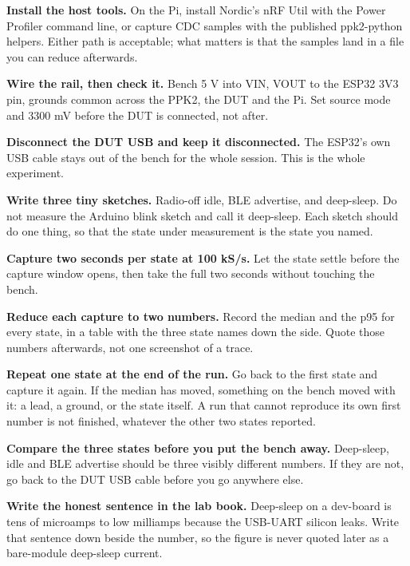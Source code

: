 \begin{steps}
\item \textbf{Install the host tools.} On the Pi, install Nordic's nRF Util with the Power
Profiler command line, or capture CDC samples with the published ppk2-python helpers.
Either path is acceptable; what matters is that the samples land in a file you can reduce
afterwards.

\item \textbf{Wire the rail, then check it.} Bench 5 V into VIN, VOUT to the ESP32 3V3 pin,
grounds common across the PPK2, the DUT and the Pi. Set source mode and 3300 mV before the
DUT is connected, not after.

\item \textbf{Disconnect the DUT USB and keep it disconnected.} The ESP32's own USB cable
stays out of the bench for the whole session. This is the whole experiment.

\item \textbf{Write three tiny sketches.} Radio-off idle, BLE advertise, and deep-sleep. Do
not measure the Arduino blink sketch and call it deep-sleep. Each sketch should do one
thing, so that the state under measurement is the state you named.

\item \textbf{Capture two seconds per state at 100 kS/s.} Let the state settle before the
capture window opens, then take the full two seconds without touching the bench.

\item \textbf{Reduce each capture to two numbers.} Record the median and the p95 for every
state, in a table with the three state names down the side. Quote those numbers afterwards,
not one screenshot of a trace.

\item \textbf{Repeat one state at the end of the run.} Go back to the first state and
capture it again. If the median has moved, something on the bench moved with it: a lead, a
ground, or the state itself. A run that cannot reproduce its own first number is not
finished, whatever the other two states reported.

\item \textbf{Compare the three states before you put the bench away.} Deep-sleep, idle and
BLE advertise should be three visibly different numbers. If they are not, go back to the
DUT USB cable before you go anywhere else.

\item \textbf{Write the honest sentence in the lab book.} Deep-sleep on a dev-board is tens
of microamps to low milliamps because the USB-UART silicon leaks. Write that sentence down
beside the number, so the figure is never quoted later as a bare-module deep-sleep current.
\end{steps}

